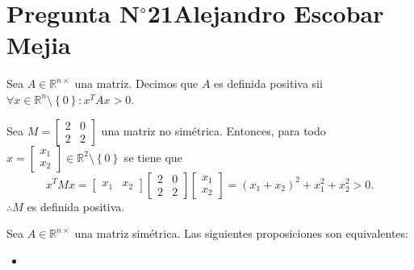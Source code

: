 \section{Pregunta N$^{\circ}$21\qquad Alejandro Escobar Mejia}

\begin{frame}
	\begin{definition}
		Sea $A\in\mathbb{R}^{n\times}$ una matriz.
		Decimos que $A$ es definida positiva sii
		\begin{math}
			\forall x\in\mathbb{R}^{n}\setminus\left\{0\right\}:
			x^{T}Ax>
			0.
		\end{math}
	\end{definition}

	\begin{example}
		Sea
		\begin{math}
			M=
			\begin{bmatrix}
				2 & 0 \\
				2 & 2
			\end{bmatrix}
		\end{math}
		una matriz \alert{no simétrica}.
		Entonces, para todo
		\begin{math}
			x=
			\begin{bmatrix}
				x_{1} \\
				x_{2}
			\end{bmatrix}
			\in\mathbb{R}^{2}\setminus\left\{0\right\}
		\end{math}
		se tiene que
		\begin{equation*}
			x^{T}Mx=
			\begin{bmatrix}
				x_{1} & x_{2}
			\end{bmatrix}
			\begin{bmatrix}
				2 & 0 \\
				2 & 2
			\end{bmatrix}
			\begin{bmatrix}
				x_{1} \\
				x_{2}
			\end{bmatrix}=
			{\left(x_{1}+x_{2}\right)}^{2}+
			x^{2}_{1}+
			x^{2}_{2}>
			0.
		\end{equation*}
		$\therefore M$ es definida positiva.
	\end{example}

	\begin{theorem}
		Sea $A\in\mathbb{R}^{n\times}$ una matriz simétrica.
		Las siguientes proposiciones son equivalentes:
		\begin{itemize}
			\item


\end{itemize}
\end{theorem}
\end{frame}
